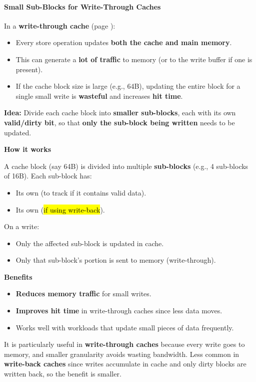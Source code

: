 \paragraph{Small Sub-Blocks for Write-Through Caches}\label{paragraph: Small Sub-Blocks for Write-Through Caches}

In a \textbf{write-through cache} (page ):
\begin{itemize}
    \item Every store operation updates \textbf{both the cache and main memory}.
    \item This can generate a \textbf{lot of traffic} to memory (or to the write buffer if one is present).
    \item If the cache block size is large (e.g., 64B), updating the entire block for a single small write is \textbf{wasteful} and increases \textbf{hit time}.
\end{itemize}
\textbf{Idea:} Divide each cache block into \textbf{smaller sub-blocks}, each with its own \textbf{valid/dirty bit}, so that \textbf{only the sub-block being written} needs to be updated.

\highspace
\begin{flushleft}
    \textcolor{Green3}{ \textbf{How it works}}
\end{flushleft}
A cache block (say 64B) is divided into multiple \textbf{sub-blocks} (e.g., 4 sub-blocks of 16B). Each sub-block has:
\begin{itemize}
    \item Its own  (to track if it contains valid data).
    \item Its own  (\hl{if using write-back}).
\end{itemize}
On a write:
\begin{itemize}
    \item Only the affected sub-block is updated in cache.
    \item Only that sub-block's portion is sent to memory (write-through).
\end{itemize}

\highspace
\begin{flushleft}
    \textcolor{Green3}{ \textbf{Benefits}}
\end{flushleft}
\begin{itemize}
    \item[\textcolor{Green3}{\faIcon{check}}] \textbf{Reduces memory traffic} for small writes.
    \item[\textcolor{Green3}{\faIcon{check}}] \textbf{Improves hit time} in write-through caches since less data moves.
    \item[\textcolor{Green3}{\faIcon{check}}] Works well with workloads that update small pieces of data frequently.
\end{itemize}
It is particularly useful in \textbf{write-through caches} because every write goes to memory, and smaller granularity avoids wasting bandwidth. Less common in \textbf{write-back caches} since writes accumulate in cache and only dirty blocks are written back, so the benefit is smaller.


